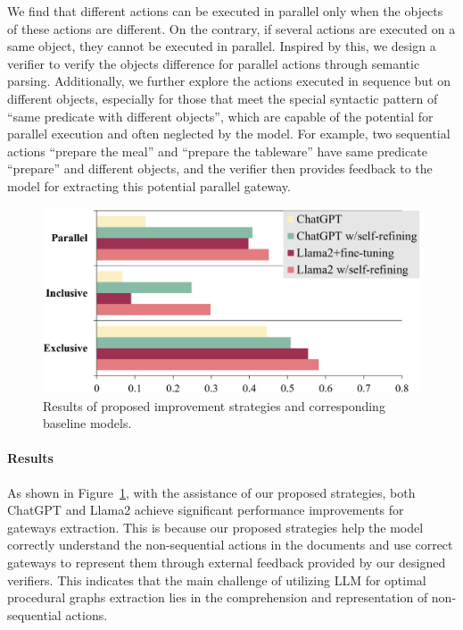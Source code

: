 We find that different actions can be executed in parallel only when the objects of these actions are different. On the contrary, if several actions are executed on a same object, they cannot be executed in parallel. 
Inspired by this, we design a verifier to verify the objects difference for parallel actions through semantic parsing. Additionally, we further explore the actions executed in sequence but on different objects, especially for those that meet the special syntactic pattern of ``same predicate with different objects'', which are capable of the potential for parallel execution and often neglected by the model. 
For example, two sequential actions ``prepare the meal'' and ``prepare the tableware'' have same predicate ``prepare'' and different objects, and the verifier then provides feedback to the model for extracting this potential parallel gateway. 

\begin{figure}[h]
    \centering
    \includegraphics[width=\linewidth]{figures/improve.png}
    \caption{Results of proposed improvement strategies and corresponding baseline models.
    }
    \label{fig:improve}
\end{figure}

% 

\paragraph{Results}
As shown in Figure~\ref{fig:improve}, with the assistance of our proposed strategies, both ChatGPT and Llama2 achieve significant performance improvements for gateways extraction. This is because our proposed strategies help the model correctly understand the non-sequential actions in the documents and use correct gateways to represent them through external feedback provided by our designed verifiers. 
This indicates that the main challenge of utilizing LLM for optimal procedural graphs extraction lies in the comprehension and representation of non-sequential actions. 


